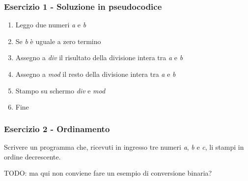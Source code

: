 \documentclass[handout]{beamer}
\begin{document}
\begin{frame}
\frametitle{Esercizio 1 - Soluzione in pseudocodice}
\begin{enumerate}
	\item Leggo due numeri \emph{a} e \emph{b}
	\item Se \emph{b} è uguale a zero termino
	\item Assegno a \emph{div} il risultato della divisione intera tra \emph{a} e \emph{b}
	\item Assegno a \emph{mod} il resto della divisione intera tra \emph{a} e \emph{b}
	\item Stampo su schermo \emph{div} e \emph{mod}
	\item Fine
\end{enumerate}
\end{frame}

\iffalse
\begin{frame}
\frametitle{Esercizio 2 - Ordinamento}
Scrivere un programma che, ricevuti in ingresso tre numeri \emph{a}, \emph{b} e \emph{c}, li stampi in ordine decrescente.

TODO: ma qui non conviene fare un esempio di conversione binaria?
\end{frame}
\end{document}
